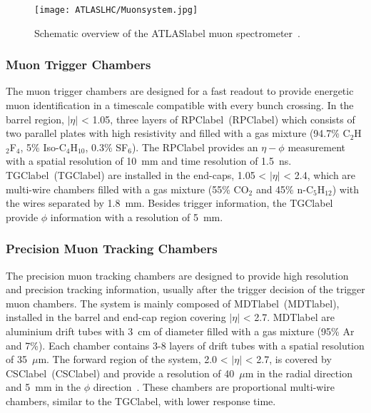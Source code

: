 \begin{figure}[htbp]
    \RawFloats
    \begin{center}
    \texttt{[image: ATLASLHC/Muonsystem.jpg]}
    \caption{
        Schematic overview of the \acrshort{ATLASlabel} muon spectrometer~\cite{Collaboration_2008}. 
    }
    \label{figLHC:ATLASMuon}
    \end{center}
\end{figure}

\subsubsection*{Muon Trigger Chambers}

The muon trigger chambers are designed for a fast readout to provide energetic muon identification in a timescale compatible with every bunch crossing. In the barrel region, $|\eta|$ < 1.05, three layers of \acrlong{RPClabel}~(\acrshort{RPClabel}) which consists of two parallel plates with high resistivity and filled with a gas mixture (94.7\% C$_2$H$_2$F$_4$, 5\% Iso-C$_4$H$_{10}$, 0.3\% SF$_6$). The \acrshort{RPClabel} provides an $\eta-\phi$ measurement with a spatial resolution of 10~mm and time resolution of 1.5~ns. \acrlong{TGClabel}~(\acrshort{TGClabel}) are installed in the end-caps, 1.05 < $|\eta|$ < 2.4, which are multi-wire chambers filled with a gas mixture (55\% CO$_2$ and 45\% n-C$_5$H$_{12}$) with the wires separated by 1.8~mm. Besides trigger information, the \acrshort{TGClabel} provide $\phi$ information with a resolution of 5~mm.

\subsubsection*{Precision Muon Tracking Chambers}

The precision muon tracking chambers are designed to provide high resolution and precision tracking information, usually after the trigger decision of the trigger muon chambers. The system is mainly composed of \acrlong{MDTlabel}~(\acrshort{MDTlabel}), installed in the barrel and end-cap region covering $|\eta|$ < 2.7. \acrshort{MDTlabel} are aluminium drift tubes with 3~cm of diameter filled with a gas mixture (95\% Ar and 7\%). Each chamber contains 3-8 layers of drift tubes with a spatial resolution of 35~$\mu$m. The forward region of the system, 2.0 < $|\eta|$ < 2.7, is covered by \acrlong{CSClabel}~(\acrshort{CSClabel}) and provide a resolution of 40~$\mu$m in the radial direction and 5~mm in the $\phi$ direction~\cite{Collaboration_2008}. These chambers are proportional multi-wire chambers, similar to the \acrshort{TGClabel}, with lower response time.

